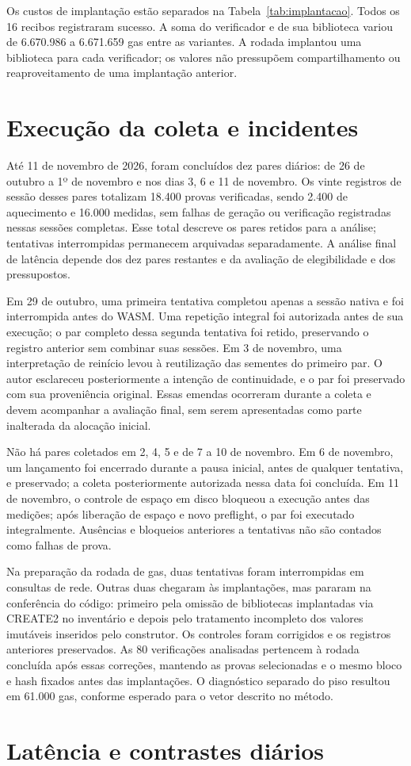 Os custos de implantação estão separados na Tabela~\ref{tab:implantacao}. Todos os 16 recibos registraram sucesso. A soma do verificador e de sua biblioteca variou de 6.670.986 a 6.671.659 gas entre as variantes. A rodada implantou uma biblioteca para cada verificador; os valores não pressupõem compartilhamento ou reaproveitamento de uma implantação anterior.



\section{Execução da coleta e incidentes}
Até 11 de novembro de 2026, foram concluídos dez pares diários: de 26 de outubro a 1º de novembro e nos dias 3, 6 e 11 de novembro. Os vinte registros de sessão desses pares totalizam 18.400 provas verificadas, sendo 2.400 de aquecimento e 16.000 medidas, sem falhas de geração ou verificação registradas nessas sessões completas. Esse total descreve os pares retidos para a análise; tentativas interrompidas permanecem arquivadas separadamente. A análise final de latência depende dos dez pares restantes e da avaliação de elegibilidade e dos pressupostos.

Em 29 de outubro, uma primeira tentativa completou apenas a sessão nativa e foi interrompida antes do WASM. Uma repetição integral foi autorizada antes de sua execução; o par completo dessa segunda tentativa foi retido, preservando o registro anterior sem combinar suas sessões. Em 3 de novembro, uma interpretação de reinício levou à reutilização das sementes do primeiro par. O autor esclareceu posteriormente a intenção de continuidade, e o par foi preservado com sua proveniência original. Essas emendas ocorreram durante a coleta e devem acompanhar a avaliação final, sem serem apresentadas como parte inalterada da alocação inicial.

Não há pares coletados em 2, 4, 5 e de 7 a 10 de novembro. Em 6 de novembro, um lançamento foi encerrado durante a pausa inicial, antes de qualquer tentativa, e preservado; a coleta posteriormente autorizada nessa data foi concluída. Em 11 de novembro, o controle de espaço em disco bloqueou a execução antes das medições; após liberação de espaço e novo preflight, o par foi executado integralmente. Ausências e bloqueios anteriores a tentativas não são contados como falhas de prova.

Na preparação da rodada de gas, duas tentativas foram interrompidas em consultas de rede. Outras duas chegaram às implantações, mas pararam na conferência do código: primeiro pela omissão de bibliotecas implantadas via CREATE2 no inventário e depois pelo tratamento incompleto dos valores imutáveis inseridos pelo construtor. Os controles foram corrigidos e os registros anteriores preservados. As 80 verificações analisadas pertencem à rodada concluída após essas correções, mantendo as provas selecionadas e o mesmo bloco e hash fixados antes das implantações. O diagnóstico separado do piso resultou em 61.000 gas, conforme esperado para o vetor descrito no método.

\section{Latência e contrastes diários}
